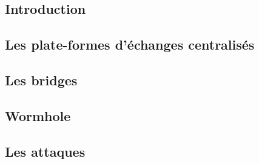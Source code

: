 \subsection{Introduction}


\subsection{Les plate-formes d'échanges centralisés}


\subsection{Les bridges}


\subsection{Wormhole}


\subsection{Les attaques}
